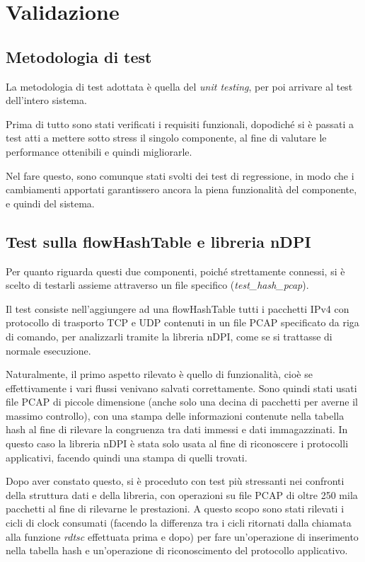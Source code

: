 \clearpage{\pagestyle{empty}\cleardoublepage}
\chapter{Validazione}

\section{Metodologia di test}

La metodologia di test adottata è quella del \emph{unit testing}, per poi arrivare al test dell'intero sistema.

Prima di tutto sono stati verificati i requisiti funzionali, dopodiché si è passati a test atti a mettere sotto stress il singolo componente, al fine di valutare le performance ottenibili e quindi migliorarle.

Nel fare questo, sono comunque stati svolti dei test di regressione, in modo che i cambiamenti apportati garantissero ancora la piena funzionalità del componente, e quindi del sistema.

\section{Test sulla flowHashTable e libreria nDPI}

Per quanto riguarda questi due componenti, poiché strettamente connessi, si è scelto di testarli assieme attraverso un file specifico (\emph{test\_hash\_pcap}).

Il test consiste nell'aggiungere ad una flowHashTable tutti i pacchetti IPv4 con protocollo di trasporto TCP e UDP contenuti in un file PCAP specificato da riga di comando, per analizzarli tramite la libreria nDPI, come se si trattasse di normale esecuzione.

Naturalmente, il primo aspetto rilevato è quello di funzionalità, cioè se effettivamente i vari flussi venivano salvati correttamente. Sono quindi stati usati file PCAP di piccole dimensione (anche solo una decina di pacchetti per averne il massimo controllo), con una stampa delle informazioni contenute nella tabella hash al fine di rilevare la congruenza tra dati immessi e dati immagazzinati. In questo caso la libreria nDPI è stata solo usata al fine di riconoscere i protocolli applicativi, facendo quindi una stampa di quelli trovati.

Dopo aver constato questo, si è proceduto con test più stressanti nei confronti della struttura dati e della libreria, con operazioni su file PCAP di oltre 250 mila pacchetti al fine di rilevarne le prestazioni. A questo scopo sono stati rilevati i cicli di clock consumati (facendo la differenza tra i cicli ritornati dalla chiamata alla funzione \emph{rdtsc} effettuata prima e dopo) per fare un'operazione di inserimento nella tabella hash e un'operazione di riconoscimento del protocollo applicativo.

